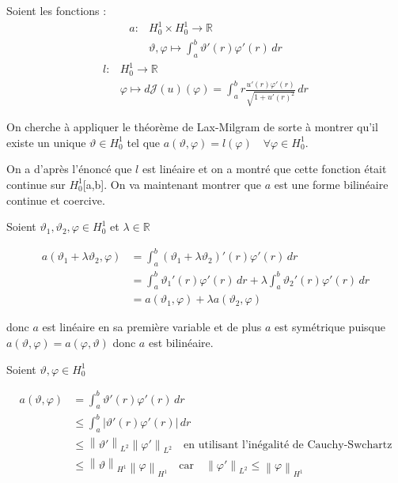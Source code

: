 \documentclass{article}
\newcommand{\Real}{ \mathbb{R} }
\newcommand{\Abs}[1]{ \left| #1 \right| }
\newcommand{\FunctionWithSqrt}[1]{ \sqrt{1 + #1 ^2} }
\newcommand{\Norm}[2]{ \left\| #1 \right\|_{#2} }
\newcommand{\Integral}[4]{ \int_{#1}^{#2} #3 \, d#4 }
\newcommand{\FunctionJ}{\mathcal{J}}
\begin{document}
{    Soient les fonctions :
    \begin{equation*}
        \begin{aligned}
            a: & H^1_0 \times H^1_0 \longrightarrow \Real \\
            & \vartheta,\varphi \longmapsto \Integral{a}{b}{\vartheta'(r)\varphi'(r)}{r}
        \end{aligned}
    \end{equation*}
    \begin{equation*}
        \begin{aligned}
            l: & H^1_0 \longrightarrow \Real \\
            & \varphi \longmapsto d\FunctionJ(u)(\varphi) = 
            \Integral{a}{b}{ r \frac{u'(r)\varphi'(r)}{\FunctionWithSqrt{u'(r)}} }{r}
        \end{aligned}
    \end{equation*}

    On cherche à appliquer le théorème de Lax-Milgram de sorte à montrer qu'il existe un unique $\vartheta \in H^1_0$ tel que $a(\vartheta, \varphi) = l(\varphi) \quad \forall \varphi \in H^1_0$.\newline

    On a d'après l'énoncé que $l$ est linéaire et on a montré que cette fonction était continue sur $H^1_0$[a,b]. On va maintenant montrer que $a$ est une forme bilinéaire continue et coercive.\newline

    Soient $\vartheta_1, \vartheta_2, \varphi \in H^1_0$ et $\lambda \in \Real$

    \begin{align*}
        a(\vartheta_1 + \lambda \vartheta_2, \varphi) &= 
        \Integral{a}{b}{(\vartheta_1 + \lambda \vartheta_2)'(r)\varphi'(r)}{r} \\
        &= \Integral{a}{b}{\vartheta_1'(r)\varphi'(r)}{r} + \lambda \Integral{a}{b}{\vartheta_2'(r)\varphi'(r)}{r} \\ 
        &= a(\vartheta_1, \varphi) + \lambda a(\vartheta_2, \varphi)
    \end{align*}

    donc $a$ est linéaire en sa première variable et de plus $a$ est symétrique puisque $a(\vartheta,\varphi) = a(\varphi,\vartheta)$ donc $a$ est bilinéaire.\newline

    Soient $\vartheta, \varphi \in H^1_0$

    \begin{align*}
        a(\vartheta,\varphi) &= \Integral{a}{b}{\vartheta'(r)\varphi'(r)}{r} \\
        &\leq \Integral{a}{b}{\Abs{\vartheta'(r)\varphi'(r)}}{r} \\
        &\leq \Norm{\vartheta'}{L^2} \Norm{\varphi'}{L^2} \quad \text{en utilisant l'inégalité de Cauchy-Swchartz} \\
        &\leq \Norm{\vartheta}{H^1} \Norm{\varphi}{H^1} \quad \text{car} \quad \Norm{\varphi'}{L^2} \leq \Norm{\varphi}{H^1}
    \end{align*}

}
\end{document}
